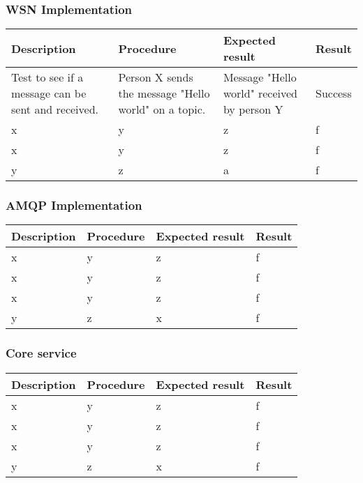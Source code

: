 \subsubsection{WSN Implementation}

\begin{table}[ht!]
\begin{tabular}{|m{3cm}|m{3cm}|m{3cm}|m{1.5cm}|}
\hline
\textbf{Description} & \textbf{Procedure} & \textbf{Expected result} & \textbf{Result}\\ \hline
Test to see if a message can be sent and received.& Person X sends the message "Hello world" on a topic.& Message "Hello world" received by person Y & Success \\ \hline
x&y&z&f \\ \hline
x&y&z&f \\ \hline
y&z&a&f \\ \hline
\end{tabular}
\end{table}

\subsubsection{AMQP Implementation}

\begin{table}[ht!]
\begin{tabular}{|m{3cm}|m{3cm}|m{3cm}|m{1.5cm}|}
\hline
\textbf{Description} & \textbf{Procedure} & \textbf{Expected result} & \textbf{Result}\\ \hline
x&y&z&f \\ \hline
x&y&z&f \\ \hline
x&y&z&f \\ \hline
y&z&x&f \\ \hline
\end{tabular}
\end{table}

\subsubsection{Core service}

\begin{table}[h]
\begin{tabular}{|m{3cm}|m{3cm}|m{3cm}|m{1.5cm}|}
\hline
\textbf{Description} & \textbf{Procedure} & \textbf{Expected result} & \textbf{Result}\\ \hline
x&y&z&f \\ \hline
x&y&z&f \\ \hline
x&y&z&f \\ \hline
y&z&x&f \\ \hline
\end{tabular}
\end{table}

